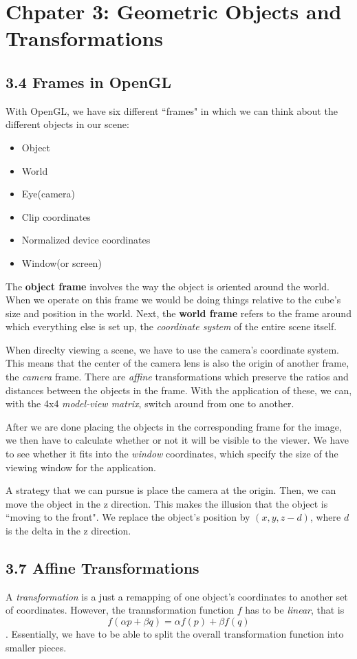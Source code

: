 \documentclass{article}
\begin{document}
\section{Chpater 3: Geometric Objects and Transformations}
\subsection{3.4 Frames in OpenGL}
With OpenGL, we have six different ``frames" in which we can think about the different objects in our scene:

\begin{itemize}
	\item{Object}
	\item{World}
	\item{Eye(camera)}
	\item{Clip coordinates}
	\item{Normalized device coordinates}
	\item{Window(or screen)}
\end{itemize}

The \textbf{object frame} involves the way the object is oriented around the world. When we operate on this frame we
would be doing things relative to the cube's size and position in the world. Next, the \textbf{world frame} refers to
the frame around which everything else is set up, the \textit{coordinate system} of the entire scene itself.

When direclty viewing a scene, we have to use the camera's coordinate system. This means that the center of the 
camera lens is also the origin of another frame, the \textit{camera} frame. There are \textit{affine} transformations
which preserve the ratios and distances between the objects in the frame. With the application of these, we can, 
with the 4x4 \textit{model-view matrix}, switch around from one to another.

After we are done placing the objects in the corresponding frame for the image, we then have to calculate whether or 
not it will be visible to the viewer. We have to see whether it fits into the \textit{window} coordinates, which 
specify the size of the viewing window for the application.

A strategy that we can pursue is place the camera at the origin. Then, we can move the object in the z direction. 
This makes the illusion that the object is ``moving to the front". We replace the object's position by $(x, y, z-d)$, 
where $d$ is the delta in the z direction.
\subsection{3.7 Affine Transformations}
A \textit{transformation} is a just a remapping of one object's coordinates to another set of coordinates. However, 
the trannsformation function $f$ has to be \textit{linear}, that is \[f(\alpha p+ \beta q)=\alpha f(p) + \beta f(q)\].
Essentially, we have to be able to split the overall transformation function into smaller pieces.
\end{document}
